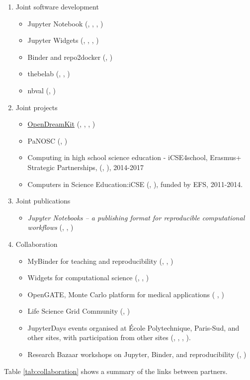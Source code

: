 \begin{enumerate}
\item Joint software development
  \begin{itemize}
  \item Jupyter Notebook (, , , )
  \item Jupyter Widgets (, , , )
  \item Binder and repo2docker (, )
  \item thebelab (, , )
  \item nbval (, )
  \end{itemize}

\item Joint projects
  \begin{itemize}
  \item \href{http://opendreamkit.org}{OpenDreamKit} (, , , )
  \item PaNOSC (, )
  \item Computing in high school science education - iCSE4school, Erasmus+ Strategic Partnerships,
  (, ), 2014-2017
  \item Computers in Science Education:iCSE (, ), funded by EFS, 2011-2014.
    \end{itemize}

\item Joint publications
  \begin{itemize}
  \item \emph{Jupyter Notebooks -- a publishing format for
      reproducible computational workflows} \cite{Kluyver2016} (, , )
  \end{itemize}

\item Collaboration
  \begin{itemize}
  \item MyBinder for teaching and reproducibility (, , )
  \item Widgets for computational science (, , )
  \item OpenGATE, Monte Carlo platform for medical applications (
    , )
  \item Life Science Grid Community (, )
  \item JupyterDays events organised at \'Ecole Polytechnique, Paris-Sud,
  and other sites, with participation from other sites
  (, , , ).
  \item Research Bazaar workshops on Jupyter, Binder, and reproducibility
    (, )
 \end{itemize}
\end{enumerate}

Table \ref{tab:collaboration} shows a summary of the links
between partners.


